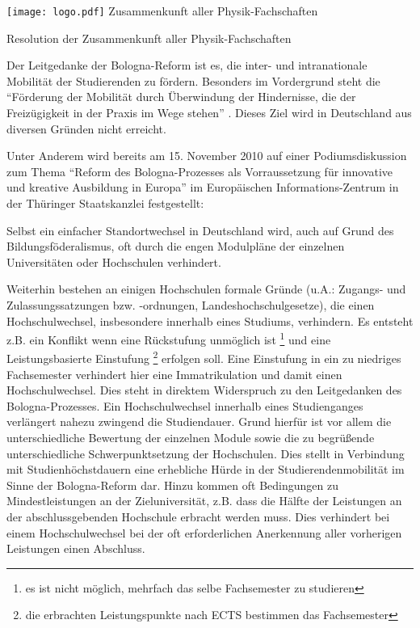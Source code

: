 \documentclass[DIV=calc]{scrartcl}
\begin{document}
    \hspace{0.87\textwidth}
    \begin{minipage}{120pt}
        \vspace{-1.8cm}
        \texttt{[image: logo.pdf]}
        \centering
        \small Zusammenkunft aller Physik-Fachschaften
    \end{minipage}
    \begin{center}
        \huge{Resolution der Zusammenkunft aller Physik-Fachschaften}\vspace{.25\baselineskip}\\
        \normalsize
    \end{center}
    \vspace{1cm}
Der Leitgedanke der Bologna-Reform ist es, die inter- und intranationale
Mobilität der Studierenden zu fördern. Besonders im Vordergrund steht die
"`Förderung der Mobilität durch Überwindung der Hindernisse, die der
Freizügigkeit in der Praxis im Wege stehen"' \cite{bologna}.  Dieses Ziel wird in
Deutschland aus diversen Gründen nicht erreicht.

Unter Anderem wird bereits am 15. November 2010 auf einer
Podiumsdiskussion zum Thema "`Reform des Bologna-Prozesses als Vorraussetzung
für innovative und kreative Ausbildung in Europa"'\cite{tsk2011} im Europäischen
Informations-Zentrum in der Thüringer Staatskanzlei festgestellt:
\begin{displayquote}
 Selbst ein einfacher Standortwechsel in Deutschland wird, auch auf Grund des
 Bildungsföderalismus, oft durch die engen Modulpläne der einzelnen
 Universitäten oder Hochschulen verhindert.
\end{displayquote}
Weiterhin bestehen an einigen Hochschulen formale Gründe (u.A.: Zugangs- und
Zulassungssatzungen bzw. -ordnungen, Landeshochschulgesetze), die einen
Hochschulwechsel, insbesondere innerhalb eines Studiums, verhindern. Es entsteht
z.B. ein Konflikt wenn eine Rückstufung unmöglich ist \footnote{es ist nicht
möglich, mehrfach das selbe Fachsemester zu studieren} und eine
Leistungsbasierte Einstufung \footnote{die erbrachten Leistungspunkte nach ECTS
bestimmen das Fachsemester} erfolgen soll. Eine Einstufung in ein zu niedriges
Fachsemester verhindert hier eine Immatrikulation und damit einen
Hochschulwechsel. Dies steht in direktem Widerspruch zu den Leitgedanken des
Bologna-Prozesses.
Ein Hochschulwechsel innerhalb eines Studienganges verlängert nahezu zwingend
die Studiendauer. Grund hierfür ist vor allem die unterschiedliche Bewertung der
einzelnen Module sowie die zu begrüßende unterschiedliche Schwerpunktsetzung der
Hochschulen. Dies stellt in Verbindung mit Studienhöchstdauern eine erhebliche
Hürde in der Studierendenmobilität im Sinne der Bologna-Reform dar.
\newpage
Hinzu kommen oft Bedingungen zu Mindestleistungen an der Zieluniversität, z.B.
dass die Hälfte der Leistungen an der abschlussgebenden Hochschule erbracht
werden muss. Dies verhindert bei einem Hochschulwechsel bei der oft
erforderlichen Anerkennung aller vorherigen Leistungen einen Abschluss.
\end{document}
